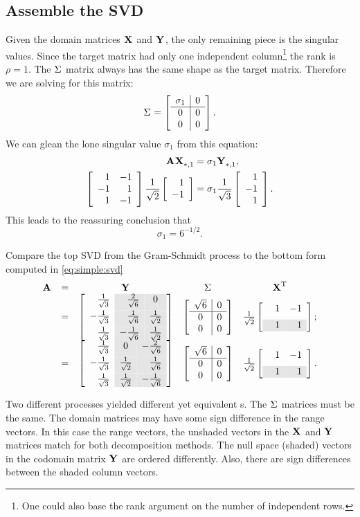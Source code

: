 \subsection{Assemble the SVD}
Given the domain matrices $\X{}$ and $\Y{}$, the only remaining piece is the singular values. Since the target matrix had only one independent column\footnote{One could also base the rank argument on the number of independent rows.} the rank is $\rho = 1$. The $\sig{}$ matrix always has the same shape as the target matrix. Therefore we are solving for this matrix:
\begin{equation}
  \sig{} = \mat{c|c}{\sigma_{1} & 0 \\\hline 0 & 0 \\ 0 & 0}.
\end{equation}
We can glean the lone singular value $\sigma_{1}$ from this equation:
\begin{equation}
  \begin{split}
    \A{}\X{}_{*,1} &= \sigma_{1}\Y{}_{*,1},\\
    \Aexample \stwo \mat{r}{1\\-1} &= \sigma_{1} \sthree \mat{r}{1\\-1\\1}.
  \end{split}
\end{equation}
This leads to the reassuring conclusion that
\begin{equation}
  \sigma_{1} = 6^{-1/2}.
\end{equation}

Compare the top SVD from the Gram-Schmidt process to the bottom form computed in \eqref{eq:simple:svd}
\begin{equation}
  \begin{array}{rcccc}
    \A{} &=& \Y{} & \sig{} & \X{T} \\
      &=& \left[
\begin{array}{ r >{\columncolor{ltgray}}r >{\columncolor{ltgray}}c }
  \sthree &  \frac{2}{ \sqrt{6} } & 0  \\[5pt]
 -\sthree &  \ssix & \stwo \\[5pt]
  \sthree & -\ssix & \stwo 
\end{array}
\right]  
   & \Sigmaexampleb 
   & \Xtshade;\\[15pt]
   &=& \Yshade & \Sigmaexampleb & \Xtshade.
  \end{array}
\end{equation}

Two different processes yielded different yet equivalent \svdl s. The $\sig{}$ matrices must be the same. The domain matrices may have some sign difference in the range vectors. In this case the range vectors, the unshaded vectors in the $\X{}$ and $\Y{}$ matrices match for both decomposition methods. The null space (shaded) vectors in the codomain matrix $\Y{}$ are ordered differently. Also, there are sign differences between the shaded column vectors.

